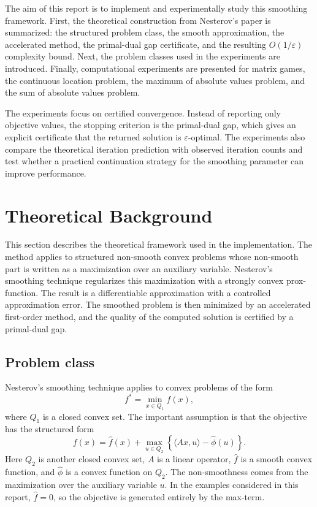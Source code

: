 \documentclass[11pt]{article}
\begin{document}
The aim of this report is to implement and experimentally study this smoothing
framework. First, the theoretical construction from Nesterov's paper is
summarized: the structured problem class, the smooth approximation, the
accelerated method, the primal-dual gap certificate, and the resulting
\(O(1/\varepsilon)\) complexity bound. Next, the problem classes used in the
experiments are introduced. Finally, computational experiments are presented for
matrix games, the continuous location problem, the maximum of absolute values
problem, and the sum of absolute values problem.

The experiments focus on certified convergence. Instead of reporting only
objective values, the stopping criterion is the primal-dual gap, which gives an
explicit certificate that the returned solution is \(\varepsilon\)-optimal. The
experiments also compare the theoretical iteration prediction with observed
iteration counts and test whether a practical continuation strategy for the
smoothing parameter can improve performance.

\section{Theoretical Background}

This section describes the theoretical framework used in the implementation.
The method applies to structured non-smooth convex problems whose non-smooth
part is written as a maximization over an auxiliary variable. Nesterov's
smoothing technique regularizes this maximization with a strongly convex
prox-function. The result is a differentiable approximation with a controlled
approximation error. The smoothed problem is then minimized by an accelerated
first-order method, and the quality of the computed solution is certified by a
primal-dual gap.

\subsection{Problem class}

Nesterov's smoothing technique \cite{nesterov2005smooth} applies to convex
problems of the form
\[
    f^*=\min_{x\in Q_1} f(x),
\]
where \(Q_1\) is a closed convex set. The important assumption is that the
objective has the structured form
\[
    f(x)
    =
    \hat f(x)
    +
    \max_{u\in Q_2}
    \left\{
        \langle Ax,u\rangle-\hat\phi(u)
    \right\}.
\]
Here \(Q_2\) is another closed convex set, \(A\) is a linear operator,
\(\hat f\) is a smooth convex function, and \(\hat\phi\) is a convex function on
\(Q_2\). The non-smoothness comes from the maximization over the auxiliary
variable \(u\). In the examples considered in this report, \(\hat f=0\), so the
objective is generated entirely by the max-term.
\end{document}
